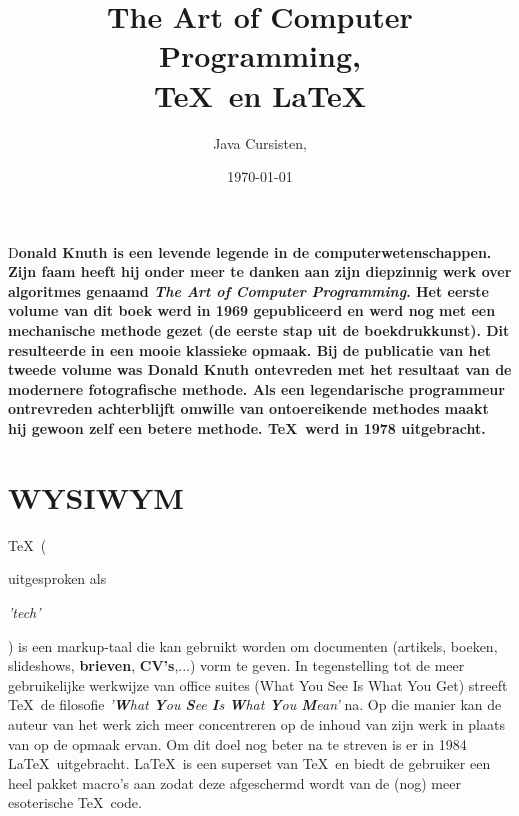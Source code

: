 \documentclass[paper=a4, fontsize=12pt, onecolumn]{scrartcl}
\title{The Art of Computer Programming, \\\TeX\ en \LaTeX}
\author{Java Cursisten, } %
\date{\today} %
\newcommand{\initial}[1]{ %
\lettrine[lines=3,lhang=0.3,nindent=0em]{
\color{DarkBlue}
{\textsf{#1}}}{}}
\begin{document}
\maketitle %

\thispagestyle{fancy} %


\initial{D}\textbf{onald Knuth is een levende legende in de computerwetenschappen. Zijn faam heeft hij onder meer te danken aan zijn diepzinnig werk over algoritmes genaamd \textit{The Art of Computer Programming}. Het eerste volume van dit boek werd in 1969 gepubliceerd en werd nog met een mechanische methode gezet (de eerste stap uit de boekdrukkunst). Dit resulteerde in een mooie klassieke opmaak. Bij de publicatie van het tweede volume was Donald Knuth ontevreden met het resultaat van de modernere foto\-grafische methode. Als een legendarische programmeur ontrevreden achter\-blijft omwille van ontoereikende me\-thodes maakt hij gewoon zelf een betere me\-thode. \TeX\ werd in 1978 uitgebracht. }


\newpage

\section*{WYSIWYM}

\TeX\ (\begin{tiny}uitgesproken als\end{tiny} \begin{small}\textit{'tech'}\end{small}) is een markup-taal die kan gebruikt worden om documenten (artikels, boeken, slideshows, \textbf{brieven}, \textbf{CV's},...) vorm te geven. In tegenstelling tot de meer gebruikelijke werkwijze van office suites (What You See Is What You Get) streeft \TeX\ de filosofie \textit{'\textbf{W}hat \textbf{Y}ou \textbf{S}ee \textbf{I}s \textbf{W}hat \textbf{Y}ou \textbf{M}ean'} na. Op die manier kan de auteur van het werk zich meer concentreren op de inhoud van zijn werk in plaats van op de opmaak ervan. Om dit doel nog beter na te streven is er in 1984 \LaTeX\ uitgebracht. \LaTeX\ is een superset van \TeX\ en biedt de gebruiker een heel pakket macro's aan zodat deze afgeschermd wordt van de (nog) meer esoterische \TeX\ code.
\end{document}
